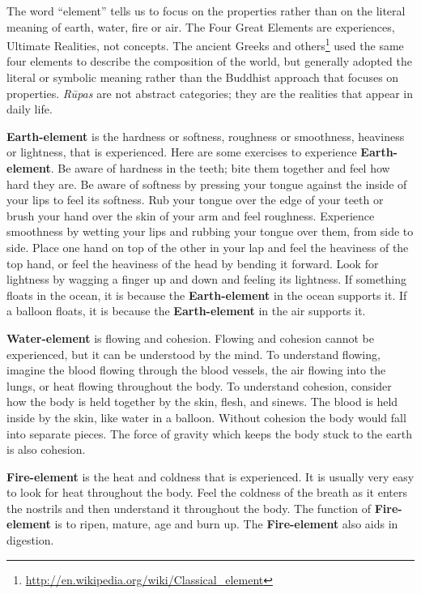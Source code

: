 The word “element” tells us to focus on the properties rather than on the literal meaning of earth, water, fire or air. The Four Great Elements are experiences, Ultimate Realities, not concepts. The ancient Greeks and others\footnote{\url{http://en.wikipedia.org/wiki/Classical_element}} used the same four elements to describe the composition of the world, but generally adopted the literal or symbolic meaning rather than the Buddhist approach that focuses on properties. \textit{Rūpas} are not abstract categories; they are the realities that appear in daily life.

\textbf{Earth-element} is the hardness or softness, roughness or smoothness, heaviness or lightness, that is experienced. Here are some exercises to experience \textbf{Earth-element}. Be aware of hardness in the teeth; bite them together and feel how hard they are. Be aware of softness by pressing your tongue against the inside of your lips to feel its softness. Rub your tongue over the edge of your teeth or brush your hand over the skin of your arm and feel roughness. Experience smoothness by wetting your lips and rubbing your tongue over them, from side to side. Place one hand on top of the other in your lap and feel the heaviness of the top hand, or feel the heaviness of the head by bending it forward. Look for lightness by wagging a finger up and down and feeling its lightness. If something floats in the ocean, it is because the \textbf{Earth-element} in the ocean supports it. If a balloon floats, it is because the \textbf{Earth-element} in the air supports it.

\textbf{Water-element} is flowing and cohesion. Flowing and cohesion cannot be experienced, but it can be understood by the mind. To understand flowing, imagine the blood flowing through the blood vessels, the air flowing into the lungs, or heat flowing throughout the body. To understand cohesion, consider how the body is held together by the skin, flesh, and sinews. The blood is held inside by the skin, like water in a balloon. Without cohesion the body would fall into separate pieces. The force of gravity which keeps the body stuck to the earth is also cohesion.

\textbf{Fire-element} is the heat and coldness that is experienced. It is usually very easy to look for heat throughout the body. Feel the coldness of the breath as it enters the nostrils and then understand it throughout the body. The function of \textbf{Fire-element} is to ripen, mature, age and burn up. The \textbf{Fire-element} also aids in digestion.

